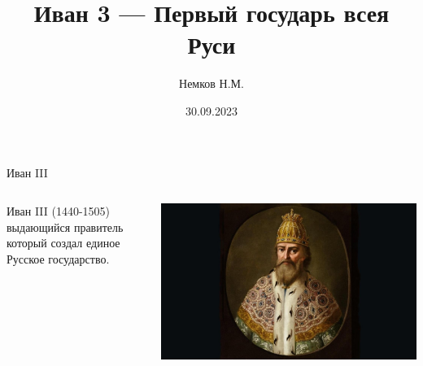 

\title{Иван 3 --- Первый государь всея Руси}
\author{Немков Н.М.}
\date{30.09.2023}



\begin{frame}
\maketitle
\end{frame}




\begin{frame}{Иван III}
	\begin{columns}
		\begin{column}{0.45\textwidth}

			Иван III (1440-1505) выдающийся правитель который создал единое Русское государство.

		\end{column}

		\begin{column}{0.45\textwidth}

			\includegraphics[width=1\textwidth]{images/ivan-1}

		\end{column}
	\end{columns}
\end{frame}

